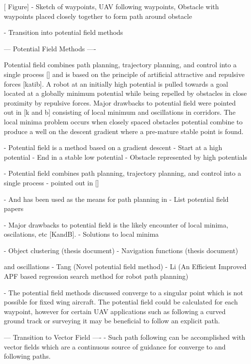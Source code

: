 \documentclass[conf]{new-aiaa}
\begin{document}
[ Figure] 
 - Sketch of waypoints, UAV following waypoints, Obstacle with waypoints placed closely together to form path around obstacle 
 
 - Transition into potential field methods
 

--- Potential Field Methods ----

Potential field combines path planning, trajectory planning, and control into a single process [] and is based on the principle of artificial attractive and repulsive forces [katib]. A robot at an initially high potential is pulled towards a goal located at a globally minimum potential while being repelled by obstacles in close proximity by repulsive forces. Major drawbacks to potential field were pointed out in [k and b] consisting of local minimum and oscillations in corridors. The local minima problem occurs when closely spaced obstacles potential combine to produce a well on the descent gradient where a pre-mature stable point is found. 


 - Potential field is a method based on a gradient descent
 	- Start at a high potential
 	- End in a stable low potential
 	- Obstacle represented by high potentials
 	
 - Potential field combines path planning, trajectory planning, and control into a single process
 	- pointed out in []
 	
 - And has been used as the means for path planning in 
 	- List potential field papers

- Major drawbacks to potential field is the likely encounter of local minima, oscilations, etc [KandB].
- Solutions to local minima

	- Object clustering (thesis document)
	- Navigation functions (thesis document)
	
	and oscillations
	- Tang (Novel potential field method)
	- Li (An Efficient Improved APF based regression search method for robot path planning)
	
- The potential field methods discussed converge to a singular point which is not possible for fixed wing aircraft. The potential field could be calculated for each waypoint, however for certain UAV applications such as following a curved ground track or surveying it may be beneficial to follow an explicit path. 




--- Transition to Vector Field ----
- Such path following can be accomplished with vector fields which are a continuous source of guidance for converge to and following paths.
\end{document}
